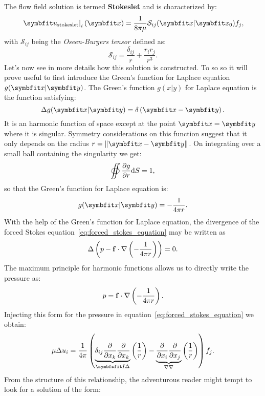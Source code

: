 The flow field solution is termed \textbf{Stokeslet} and is characterized by: 
\begin{equation}
\left.\bu_{\text{stokeslet}}\right|_i(\bx)=\frac{1}{8\pi\mu}\mathcal S_{ij}(\bx |\bx_0) f_j,
\label{eq:stokeslet_velocity_component}
\end{equation}
with $\mathcal S_{ij}$ being the \textit{Oseen-Burgers tensor} defined as:
\begin{equation}
\mathcal S_{ij}=\frac{\delta_{ij}}{r}+\frac{r_i r_j}{r^3}.
\end{equation}
Let's now see in more details how this solution is constructed. To so so it will prove useful to first introduce the Green's function for Laplace equation $g(\bx |\by)$.
 The Green's function $g(x|y)$ for Laplace equation is the function satisfying:
\begin{equation}
\Delta g(\bx |\by) = \delta\lp\bx-\by\rp.
\end{equation}
It is an harmonic function of space except at the point $\bx=\by$ where it is singular. Symmetry considerations on this function suggest that it only depends on the radius $r = \left\|\bx-\by\right\|$. On integrating over a small ball containing the singularity we get:
$$
\oiint \frac{\partial g}{\partial r} \mathrm dS = 1,
$$
so that the Green's function for Laplace equation is:
\begin{equation}
g(\bx |\by) = -\frac{1}{4\pi r}.
\end{equation}
 With the help of the Green's function for Laplace equation, the divergence of the forced Stokes equation~\eqref{eq:forced_stokes_equation} may be written as
\begin{equation}
\Delta\left( p-\mathbf f\cdot\nabla\left(-\frac{1}{4\pi r}\right)\right) = 0.
\end{equation}
The maximum principle for harmonic functions allows us to directly write the pressure as:
\begin{equation}
p=\mathbf f\cdot\nabla\left(-\frac{1}{4\pi r}\right).
\end{equation}
Injecting this form for the pressure in equation~\eqref{eq:forced_stokes_equation} we obtain:
\begin{equation}
\mu \Delta u_i=\frac{1}{4\pi}\lp\underbrace{\delta_{ij}\pd{}{x_k}\pd{}{x_k}}_{\symbfsfit I \Delta}\lp\frac{1}{r}\rp-\underbrace{\pd{}{x_i}\pd{}{x_j}}_{\nabla\nabla}\lp\frac{1}{r}\rp\rp f_j.
\label{eq:stokeslet_velocity_laplacian}
\end{equation}
From the structure of this relationship, the adventurous reader might tempt to look for a solution of the form:
